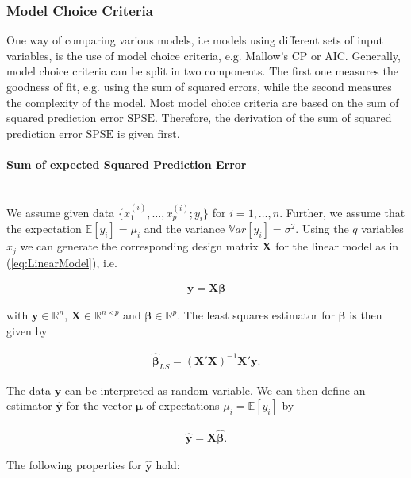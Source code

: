 \documentclass[10pt,a4paper]{article}
\newcommand{\subsubsubsection}[1]{\paragraph{#1}\mbox{}\\}
\begin{document}
\subsubsection{Model Choice Criteria} \label{subsubsec:MCC}

One way of comparing various models, i.e models using different sets of input variables, is the use of model choice criteria, e.g. Mallow's CP or AIC. Generally, model choice criteria can be split in two components. The first one measures the goodness of fit, e.g. using the sum of squared errors, while the second measures the complexity of the model. Most model choice criteria are based on the sum of squared prediction error $\text{SPSE}$. Therefore, the derivation of the sum of squared prediction error $\text{SPSE}$ is given first. 

\subsubsubsection{Sum of expected Squared Prediction Error}

We assume given data $\{ x^{(i)}_{1}, \dots, x^{(i)}_{p}; y_i\}$ for $i =1, \dots, n$. Further, we assume that the expectation $\mathbb{E}[y_i] = \mu_i$ and the variance $\mathbb{V}ar[y_i] = \sigma^2$. Using the $q$ variables $x_j$ we can generate the corresponding design matrix $\boldsymbol{X}$ for the linear model as in (\ref{eq:LinearModel}), i.e.

\begin{align}
	\boldsymbol{y} = \boldsymbol{X} \boldsymbol{\beta}
\end{align}

with $\boldsymbol{y} \in \mathbb{R}^n$, $\boldsymbol{X} \in \mathbb{R}^{n \times p}$ and $\boldsymbol{\beta} \in \mathbb{R}^p$. The least squares estimator for $\boldsymbol{\beta}$ is then given by

\begin{align}
	\boldsymbol{\hat{\beta}}_{LS} = (\boldsymbol{X}'\boldsymbol{X})^{-1}\boldsymbol{X}'\boldsymbol{y}.
\end{align}

The data $\boldsymbol{y}$ can be interpreted as random variable. We can then define an estimator $\boldsymbol{\hat{y}}$ for the vector $\boldsymbol{\mu}$ of expectations $\mu_i = \mathbb{E}[y_i]$ by

\begin{align} 
	\boldsymbol{\hat{y}} = \boldsymbol{X}  \boldsymbol{\hat{\beta}}.
\end{align}

The following properties for $\boldsymbol{\hat{y}}$ hold:
\end{document}
